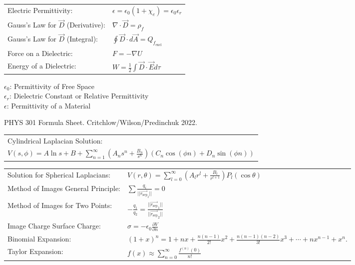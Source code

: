 \documentclass{article}
\newcommand{\sepvec}{\vec{r_\textrm{sep}}}
\newcommand{\formbox}[2]{\begin{center} \begin{tcolorbox}[colback=white, title = #1, boxrule=2pt,arc=3.4pt,boxsep=0mm] #2\end{tcolorbox}\end{center}}
\begin{document}
\begin{multicols*}{2}
{{\begin{tabular}{ m{12em} m{25em}  }
            Electric Permittivity: & $\displaystyle \epsilon = \epsilon_0 (1 + \chi_e) = \epsilon_0 \epsilon_r$\\
            Gauss's Law for $\vec{D}$ (Derivative): & $\displaystyle \nabla \cdot \vec{D} = \rho_f$\\
            Gauss's Law for $\vec{D}$ (Integral): & $\displaystyle \oint\vec{D} \cdot d\vec{A} = Q_{f_\textrm{encl}}$\\
            Force on a Dielectric: & $F = -\nabla U$\\
            Energy of a Dielectric: & $W = \frac{1}{2}\int \vec{D} \cdot \vec{E} d\tau$
        \end{tabular}}
    }
    \formbox{Names of Stuff}{
        $\epsilon_0$: Permittivity of Free Space\\
        $\epsilon_r$: Dielectric Constant or Relative Permittivity\\
        $\epsilon$: Permittivity of a Material
    }
    PHYS 301 Formula Sheet. Critchlow/Wilson/Predinchuk 2022.
    \formbox{Techniques for Solving Problems}{
        {\renewcommand{\arraystretch}{1.75}%
        \begin{tabular}{ l }
            Cylindrical Laplacian Solution:\\
            $\displaystyle V(s, \phi) = A \ln s +
            B + \sum_{n = 1}^\infty \left(A_n s^n + \frac{B_n}{s^n}\right)
            \left(C_n \cos (\phi n) + D_n \sin(\phi n)\right)$\\
        \end{tabular}
        \begin{tabular}{ m{12em} m{20em}  }
            Solution for Spherical Laplacians: & $\displaystyle V(r, \theta) = \sum_{l = 0}^\infty{\left(A_l r^l + \frac{B_l}{r^{l + 1}}\right)P_l(\cos \theta)}$\\
            Method of Images General Principle: & $\displaystyle \sum \frac{q_i}{||\sepvec_i||} = 0$\\
            Method of Images for Two Points: & $\displaystyle -\frac{q_1}{q_2} = \frac{||\sepvec_1||}{||\sepvec_2||}$\\
            Image Charge Surface Charge: & $\displaystyle \sigma = - \epsilon_0 \frac{\partial V}{\partial n}$\\
            Binomial Expansion: & $(1+x)^n = 1 + n x + \frac{n(n-1)}{2!}x^2 + \frac{n(n-1)(n-2)}{3!}x^3 + \cdots + n x^{n-1} + x^n.$\\
            Taylor Expansion: & $\displaystyle f(x) \approx \sum_{n=0}^\infty \frac{f^{(n)}(0)}{n!}$\\

\end{tabular}}}
\end{multicols*}
\end{document}
